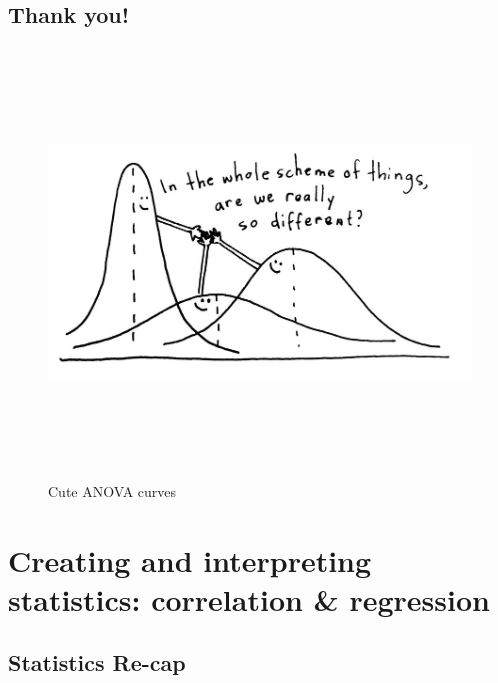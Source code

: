 \documentclass[
]{book}
\begin{document}
\section{Thank you!}\label{thank-you-1}

\begin{figure}
\centering
\includegraphics[width=\textwidth,height=4.47917in]{./img/sweet-anova.png}
\caption{Cute ANOVA curves}\label{id}
\end{figure}

\chapter{Creating and interpreting statistics: correlation \& regression}\label{creating-and-interpreting-statistics-correlation-regression}

\section{\texorpdfstring{Statistics Re-cap }{Statistics Re-cap }}\label{statistics-re-cap}
\end{document}
